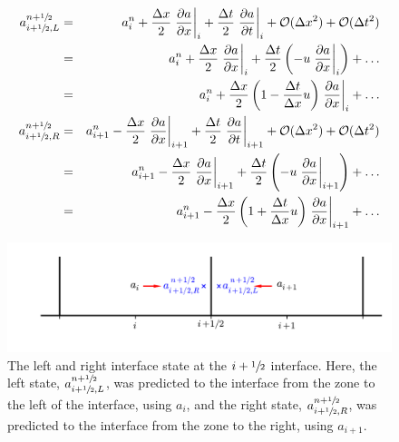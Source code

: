 \begin{eqnarray}
a_{i+{\sfrac{1}{2}},L}^{n+{\sfrac{1}{2}}} &=& a_i^n + \frac{\Delta x}{2} \left .\frac{\partial a}{\partial x} \right |_i + \frac{\Delta t}{2} \left .\frac{\partial a}{\partial t} \right |_i + \mathcal{O}(\Delta x^2) + \mathcal{O}(\Delta t^2) \nonumber \\
    &=& a_i^n + \frac{\Delta x}{2} \left .\frac{\partial a}{\partial x} \right |_i +  \frac{\Delta t}{2} \left ( - u \left .\frac{\partial a}{\partial x} \right |_i \right ) + \ldots \nonumber \\
    &=& a_i^n + \frac{\Delta x}{2} \left ( 1 - \frac{\Delta t}{\Delta x} u \right ) \left .\frac{\partial a}{\partial x} \right |_i +  \ldots \label{eq:statel}\\
a_{i+{\sfrac{1}{2}},R}^{n+{\sfrac{1}{2}}} &=& a_{i+1}^n - \frac{\Delta x}{2} \left .\frac{\partial a}{\partial x} \right |_{i+1} + \frac{\Delta t}{2} \left .\frac{\partial a}{\partial t} \right |_{i+1} + \mathcal{O}(\Delta x^2) + \mathcal{O}(\Delta t^2) \nonumber \\
    &=& a_{i+1}^n - \frac{\Delta x}{2} \left .\frac{\partial a}{\partial x} \right |_{i+1} +  \frac{\Delta t}{2} \left ( - u \left .\frac{\partial a}{\partial x} \right |_{i+1} \right ) + \ldots \nonumber \\
    &=& a_{i+1}^n - \frac{\Delta x}{2} \left ( 1 + \frac{\Delta t}{\Delta x} u \right ) \left .\frac{\partial a}{\partial x} \right |_{i+1} +  \ldots \label{eq:stater}
\end{eqnarray}
\begin{figure}[t]
\centering
\includegraphics[width=5.0in]{riemann-adv}
\caption[The input state to the Riemann
  problem]{\label{fig:riemann_adv} The left and right interface state
  at the $i+{\sfrac{1}{2}}$ interface.  Here, the left state,
  $a_{i+{\sfrac{1}{2}},L}^{n+{\sfrac{1}{2}}}$, was predicted to the interface from
  the zone to the left of the interface, using $a_i$, and the right
  state, $a_{i+{\sfrac{1}{2}},R}^{n+{\sfrac{1}{2}}}$, was predicted to the interface
  from the zone to the right, using $a_{i+1}$.}
\end{figure}

